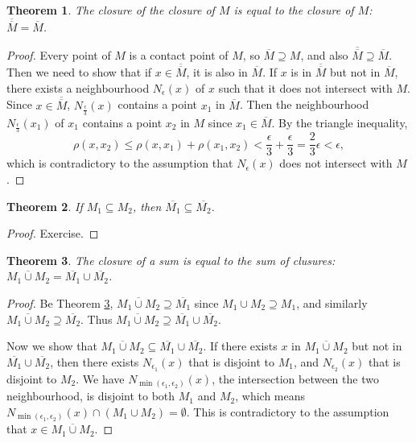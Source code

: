 \documentclass[a4paper,12pt]{article}
\newtheorem{thm}{Theorem}[section]
\theoremstyle{definition}
\theoremstyle{remark}
\begin{document}
\begin{thm}
  The closure of the closure of $M$ is equal to the closure of $M$: $\overline{\overline{M}} = \overline{M}$.
\end{thm}
\begin{proof}
  Every point of $M$ is a contact point of $M$, so $\overline{M} \supseteq M$, and also $\overline{\overline{M}} \supseteq \overline{M}$. Then we need to show that if $x \in \overline{\overline{M}}$, it is also in $\overline{M}$. If $x$ is in $\overline{\overline{M}}$ but not in $\overline{M}$, there exists a neighbourhood $N_{\epsilon}(x)$ of $x$ such that it does not intersect with $M$. Since $x \in \overline{\overline{M}}$, $N_{\frac{\epsilon}{3}}(x)$ contains a point $x_1$ in $\overline{M}$. Then the neighbourhood $N_{\frac{\epsilon}{3}}(x_1)$ of $x_1$ contains a point $x_2$ in $M$ since $x_1 \in \overline{M}$. By the triangle inequality,
  \begin{equation*}
    \rho(x, x_2) \leq \rho(x, x_1) + \rho(x_1, x_2) < \frac{\epsilon}{3} + \frac{\epsilon}{3} = \frac{2}{3}\epsilon < \epsilon,
  \end{equation*}
  which is contradictory to the assumption that $N_{\epsilon}(x)$ does not intersect with $M$.
\end{proof}

\begin{thm}
  If $M_1 \subseteq M_2$, then $\overline{M_1} \subseteq \overline{M_2}$.
\end{thm}
\begin{proof}
  Exercise.
\end{proof}

\begin{thm} \label{thm:closure_sum}
  The closure of a sum is equal to the sum of clusures: $\overline{M_1 \cup M_2} = \overline{M_1} \cup \overline{M_2}$.
\end{thm}
\begin{proof}
  Be Theorem \ref{thm:closure_sum}, $\overline{M_1 \cup M_2} \supseteq \overline{M_1}$ since $M_1 \cup M_2 \supseteq M_1$, and similarly $\overline{M_1 \cup M_2} \supseteq \overline{M_2}$. Thus $\overline{M_1 \cup M_2} \supseteq \overline{M_1} \cup \overline{M_2}$.

  Now we show that $\overline{M_1 \cup M_2} \subseteq \overline{M_1} \cup \overline{M_2}$. If there exists $x$ in $\overline{M_1 \cup M_2}$ but not in $\overline{M_1} \cup \overline{M_2}$, then there exists $N_{\epsilon_1}(x)$ that is disjoint to $M_1$, and $N_{\epsilon_2}(x)$ that is disjoint to $M_2$. We have $N_{\min(\epsilon_1, \epsilon_2)}(x)$, the intersection between the two neighbourhood, is disjoint to both $M_1$ and $M_2$, which means $N_{\min(\epsilon_1, \epsilon_2)}(x) \cap (M_1 \cup M_2) = \emptyset$. This is contradictory to the assumption that $x \in \overline{M_1 \cup M_2}$.
\end{proof}
\end{document}

